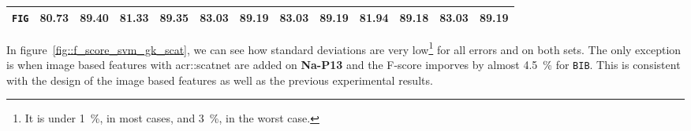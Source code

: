 \begin{sidewaystable}[htpb]
\begin{tabular}{| c | c c | c c | c c | c c | c c | c c |}
                \hline
                \texttt{FIG} & 80.73 & 89.40 & 81.33 & 89.35 & \textbf{83.03} & \textbf{89.19} & \textbf{83.03} & \textbf{89.19} & 81.94 & 89.18 & \textbf{83.03} & \textbf{89.19} \\
                \hline
            \end{tabular}
            \caption{
                \label{tab::stats_gk_scat_svm_f3}
                \gls{acr::svm} results using graph kernels and \glspl{acr::scatnet}, expressed in percentage, on the two datasets at \textbf{\gls{acr::efin}} level 3.
            }
        \end{sidewaystable}

        In figure~\ref{fig::f_score_svm_gk_scat}, we can see how standard deviations are very low\footnote{
            It is under \SI{1}{\percent}, in most cases, and \SI{3}{\percent}, in the worst case.
        } for all errors and on both sets.
        The only exception is when image based features with \gls{acr::scatnet} are added on \textbf{Na-P13} and the F-score imporves by almost \SI{4.5}{\percent} for \texttt{BIB}.
        This is consistent with the design of the image based features as well as the previous experimental results.\\

